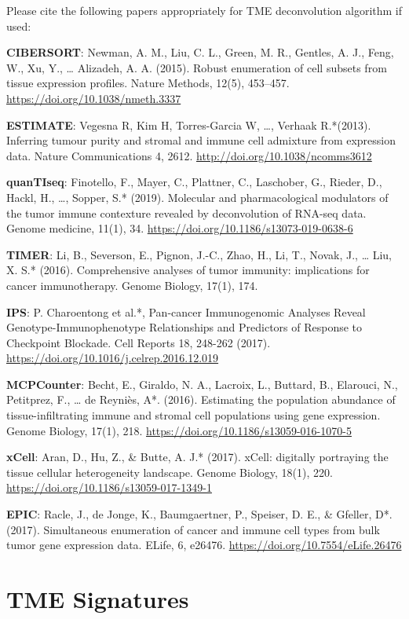 \documentclass[
  12pt,
]{book}
\begin{document}
Please cite the following papers appropriately for TME deconvolution algorithm if used:

\textbf{CIBERSORT}: Newman, A. M., Liu, C. L., Green, M. R., Gentles, A. J., Feng, W., Xu, Y., \ldots{} Alizadeh, A. A. (2015). Robust enumeration of cell subsets from tissue expression profiles. Nature Methods, 12(5), 453--457. \url{https://doi.org/10.1038/nmeth.3337}

\textbf{ESTIMATE}: Vegesna R, Kim H, Torres-Garcia W, \ldots, Verhaak R.*(2013). Inferring tumour purity and stromal and immune cell admixture from expression data. Nature Communications 4, 2612. \url{http://doi.org/10.1038/ncomms3612}

\textbf{quanTIseq}: Finotello, F., Mayer, C., Plattner, C., Laschober, G., Rieder, D., Hackl, H., \ldots, Sopper, S.* (2019). Molecular and pharmacological modulators of the tumor immune contexture revealed by deconvolution of RNA-seq data. Genome medicine, 11(1), 34. \url{https://doi.org/10.1186/s13073-019-0638-6}

\textbf{TIMER}: Li, B., Severson, E., Pignon, J.-C., Zhao, H., Li, T., Novak, J., \ldots{} Liu, X. S.* (2016). Comprehensive analyses of tumor immunity: implications for cancer immunotherapy. Genome Biology, 17(1), 174.

\textbf{IPS}: P. Charoentong et al.*, Pan-cancer Immunogenomic Analyses Reveal Genotype-Immunophenotype Relationships and Predictors of Response to Checkpoint Blockade. Cell Reports 18, 248-262 (2017). \url{https://doi.org/10.1016/j.celrep.2016.12.019}

\textbf{MCPCounter}: Becht, E., Giraldo, N. A., Lacroix, L., Buttard, B., Elarouci, N., Petitprez, F., \ldots{} de Reyniès, A*. (2016). Estimating the population abundance of tissue-infiltrating immune and stromal cell populations using gene expression. Genome Biology, 17(1), 218. \url{https://doi.org/10.1186/s13059-016-1070-5}

\textbf{xCell}: Aran, D., Hu, Z., \& Butte, A. J.* (2017). xCell: digitally portraying the tissue cellular heterogeneity landscape. Genome Biology, 18(1), 220. \url{https://doi.org/10.1186/s13059-017-1349-1}

\textbf{EPIC}: Racle, J., de Jonge, K., Baumgaertner, P., Speiser, D. E., \& Gfeller, D*. (2017). Simultaneous enumeration of cancer and immune cell types from bulk tumor gene expression data. ELife, 6, e26476. \url{https://doi.org/10.7554/eLife.26476}

\hypertarget{tme-signatures}{%
\section{TME Signatures}\label{tme-signatures}}
\end{document}
